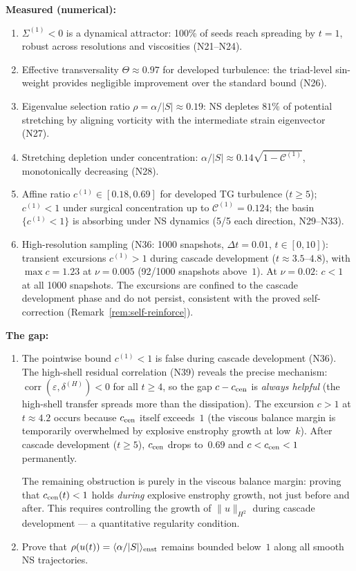 \documentclass[11pt]{article}
\theoremstyle{definition}
\newcommand{\cC}{\mathcal{C}}
\DeclareMathOperator{\corr}{corr}
\begin{document}
\noindent\textbf{Measured (numerical):}
\begin{enumerate}[leftmargin=2em,label=\textbf{(N\arabic*$'$)}]
\item $\Sigma^{(1)}<0$ is a dynamical attractor:
  100\% of seeds reach spreading by $t=1$, robust
  across resolutions and viscosities (N21--N24).
\item Effective transversality $\Theta\approx 0.97$
  for developed turbulence: the triad-level
  sin-weight provides negligible improvement over
  the standard bound (N26).
\item Eigenvalue selection ratio $\rho=\alpha/|S|
  \approx 0.19$: NS depletes $81\%$ of potential
  stretching by aligning vorticity with the
  intermediate strain eigenvector (N27).
\item Stretching depletion under concentration:
  $\alpha/|S|\approx 0.14\sqrt{1-\cC^{(1)}}$,
  monotonically decreasing (N28).
\item Affine ratio $c^{(1)}\in[0.18, 0.69]$ for
  developed TG turbulence ($t\geq 5$); $c^{(1)}<1$
  under surgical concentration up to
  $\cC^{(1)}=0.124$; the basin $\{c^{(1)}<1\}$ is
  absorbing under NS dynamics (5/5 each direction,
  N29--N33).
\item High-resolution sampling (N36: 1000 snapshots,
  $\Delta t=0.01$, $t\in[0,10]$): transient
  excursions $c^{(1)}>1$ during cascade development
  ($t\approx 3.5$--$4.8$), with $\max c = 1.23$ at
  $\nu=0.005$ (92/1000 snapshots above~$1$).
  At $\nu=0.02$: $c<1$ at all 1000 snapshots.
  The excursions are confined to the cascade
  development phase and do not persist, consistent
  with the proved self-correction
  (Remark~\ref{rem:self-reinforce}).
\end{enumerate}

\noindent\textbf{The gap:}
\begin{enumerate}[leftmargin=2em,label=\textbf{(G\arabic*)}]
\item The pointwise bound $c^{(1)}<1$ is false
  during cascade development (N36).  The high-shell
  residual correlation (N39) reveals the precise
  mechanism: $\corr(\varepsilon,\delta^{(H)})<0$
  for all $t\geq 4$, so the gap $c-c_{\rm cen}$
  is \emph{always helpful} (the high-shell transfer
  spreads more than the dissipation).  The excursion
  $c>1$ at $t\approx 4.2$ occurs because
  $c_{\rm cen}$ itself exceeds~$1$ (the viscous
  balance margin is temporarily overwhelmed by
  explosive enstrophy growth at low~$k$).  After
  cascade development ($t\geq 5$), $c_{\rm cen}$
  drops to~$0.69$ and $c<c_{\rm cen}<1$ permanently.

  The remaining obstruction is purely in the
  viscous balance margin: proving that
  $c_{\rm cen}(t)<1$ holds \emph{during} explosive
  enstrophy growth, not just before and after.
  This requires controlling the growth of
  $\|u\|_{H^2}$ during cascade development ---
  a quantitative regularity condition.
\item Prove that $\rho(u(t))=
  \langle\alpha/|S|\rangle_{\rm enst}$ remains
  bounded below~$1$ along all smooth NS
  trajectories.
\end{enumerate}
\end{document}
